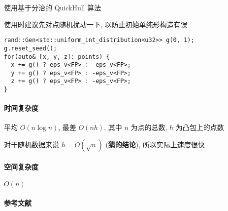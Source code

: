 使用基于分治的 QuickHull 算法

使用时建议先对点随机扰动一下, 以防止初始单纯形构造有误

\begin{verbatim}
rand::Gen<std::uniform_int_distribution<u32>> g(0, 1);
g.reset_seed();
for(auto& [x, y, z]: points) {
  x += g() ? eps_v<FP> : -eps_v<FP>;
  y += g() ? eps_v<FP> : -eps_v<FP>;
  z += g() ? eps_v<FP> : -eps_v<FP>;
}
\end{verbatim}

\paragraph{时间复杂度} 平均 \(O(n\log n)\), 最差 \(O(nh)\), 其中 \(n\) 为点的总数, \(h\) 为凸包上的点数

对于随机数据来说 \(h=O\left(\sqrt{n}\right)\) (\textbf{猜的结论}), 所以实际上速度很快

\paragraph{空间复杂度} \(O(n)\)

\paragraph{参考文献} \cite{barber1996quickhull}